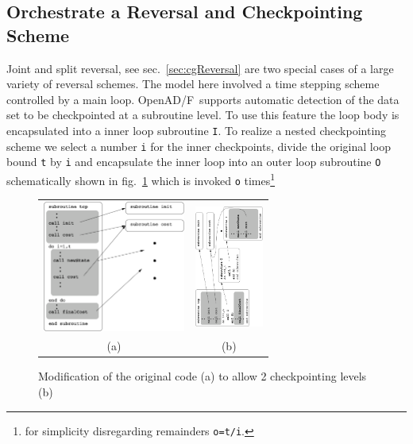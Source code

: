 \documentclass{book}
\newcommand{\OpenADF}{OpenAD/F}
\newcommand{\refsec}[1]{{sec.~\ref{#1}}}
\newcommand{\reffig}[1]{{fig.~\ref{#1}}}
\begin{document}
\subsection{Orchestrate a Reversal and Checkpointing Scheme}
Joint and split reversal, see \refsec{sec:cgReversal} are two special cases 
of a large variety of reversal schemes. The model here involved a time stepping 
scheme controlled by a main loop. \OpenADF\ supports automatic detection of the 
data set to be checkpointed at a subroutine level. To use this feature the loop 
body is encapsulated into a inner loop subroutine \lstinline{I}. To realize a nested checkpointing scheme
we select a number \lstinline{i} for the inner checkpoints, 
divide the original loop bound \lstinline{t} by \lstinline{i} and encapsulate the inner loop 
into an outer loop subroutine \lstinline{O} schematically shown in \reffig{fig:checkpointLoops} 
which is invoked \lstinline{o} times\footnote{
for simplicity disregarding remainders \lstinline{o=t/i}.
}
\begin{figure}
\begin{tabular}{cc}
\begin{minipage}{5cm}
\includegraphics[height=4.3cm]{checkpointLoops}
\end{minipage}
&
\begin{minipage}{6cm}
\includegraphics[height=4cm]{checkpointLoopsNew2}
\end{minipage}\\
(a)& (b)
\end{tabular}
\caption{Modification of the original code (a) to allow 2 checkpointing levels (b)}\label{fig:checkpointLoops}
\end{figure}
\end{document}
